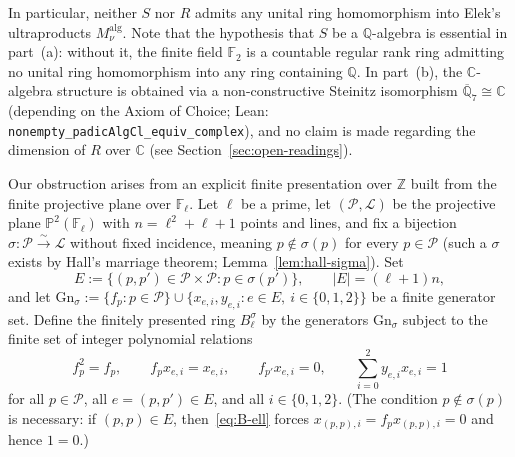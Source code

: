 \documentclass[11pt]{article}
\theoremstyle{definition}
\theoremstyle{remark}
\numberwithin{equation}{section}
\newcommand{\Q}{\mathbb{Q}}
\newcommand{\Z}{\mathbb{Z}}
\newcommand{\C}{\mathbb{C}}
\newcommand{\F}{\mathbb{F}}
\newcommand{\PP}{\mathcal{P}}
\newcommand{\LL}{\mathcal{L}}
\newcommand{\1}{\mathbf{1}}
\newcommand{\code}[1]{{\normalfont\small\texttt{#1}}}
\begin{document}
In particular, neither $S$ nor $R$ admits any unital ring homomorphism into Elek's ultraproducts $M^{\mathrm{alg}}_\nu$. Note that the hypothesis that $S$ be a $\Q$-algebra is essential in part~(a): without it, the finite field $\F_2$ is a countable regular rank ring admitting no unital ring homomorphism into any ring containing $\Q$. In part~(b), the $\C$-algebra structure is obtained via a non-constructive Steinitz isomorphism $\overline{\Q}_7 \cong \C$ (depending on the Axiom of Choice; Lean: \code{nonempty\_padicAlgCl\_equiv\_complex}), and no claim is made regarding the dimension of $R$ over $\C$ (see Section~\ref{sec:open-readings}).

Our obstruction arises from an explicit finite presentation over $\Z$ built from the finite projective plane over $\F_\ell$. Let $\ell$ be a prime, let $(\PP, \LL)$ be the projective plane $\mathbb{P}^2(\F_\ell)$ with $n = \ell^2 + \ell + 1$ points and lines, and fix a bijection $\sigma\colon \PP \xrightarrow{\sim} \LL$ without fixed incidence, meaning $p \notin \sigma(p)$ for every $p \in \PP$ (such a $\sigma$ exists by Hall's marriage theorem; Lemma~\ref{lem:hall-sigma}). Set
\[
E := \{(p, p') \in \PP \times \PP : p \in \sigma(p')\}, \qquad |E| = (\ell + 1)n,
\]
and let $\mathrm{Gn}_\sigma := \{f_p : p \in \PP\} \cup \{x_{e,i}, y_{e,i} : e \in E,\ i \in \{0,1,2\}\}$ be a finite generator set. Define the finitely presented ring $B_\ell^\sigma$ by the generators $\mathrm{Gn}_\sigma$ subject to the finite set of integer polynomial relations
\begin{equation}
\label{eq:B-ell}
f_p^2 = f_p, \qquad f_p x_{e,i} = x_{e,i}, \qquad f_{p'} x_{e,i} = 0, \qquad \sum_{i=0}^{2} y_{e,i} x_{e,i} = 1
\end{equation}
for all $p \in \PP$, all $e = (p, p') \in E$, and all $i \in \{0,1,2\}$. (The condition $p \notin \sigma(p)$ is necessary: if $(p,p) \in E$, then~\eqref{eq:B-ell} forces $x_{(p,p),i} = f_p x_{(p,p),i} = 0$ and hence $1 = 0$.)
\end{document}
